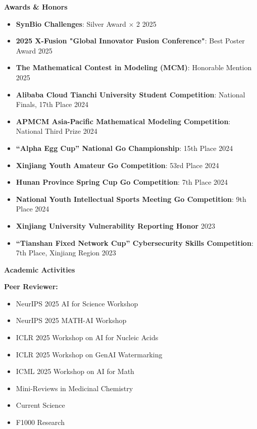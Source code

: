 \documentclass[11pt]{article}
\begin{document}
	\vspace{12pt}
	
	\begin{center}
		\textbf{\large Awards \& Honors}
	\end{center}
	\begin{itemize}[noitemsep, topsep=0pt, partopsep=0pt, parsep=0pt, leftmargin=*]
		\item \textbf{SynBio Challenges}: Silver Award $\times$ 2 \hfill 2025
		\item \textbf{2025 X-Fusion "Global Innovator Fusion Conference"}: Best Poster Award \hfill 2025
		\item \textbf{The Mathematical Contest in Modeling (MCM)}: Honorable Mention \hfill 2025
		\item \textbf{Alibaba Cloud Tianchi University Student Competition}: National Finals, 17th Place \hfill 2024
		\item \textbf{APMCM Asia-Pacific Mathematical Modeling Competition}: National Third Prize \hfill 2024
		\item \textbf{“Alpha Egg Cup” National Go Championship}: 15th Place \hfill 2024
		\item \textbf{Xinjiang Youth Amateur Go Competition}: 53rd Place \hfill 2024
		\item \textbf{Hunan Province Spring Cup Go Competition}: 7th Place \hfill 2024
		\item \textbf{National Youth Intellectual Sports Meeting Go Competition}: 9th Place \hfill 2024
		\item \textbf{Xinjiang University Vulnerability Reporting Honor} \hfill 2023
		\item \textbf{“Tianshan Fixed Network Cup” Cybersecurity Skills Competition}: 7th Place, Xinjiang Region \hfill 2023
	\end{itemize}

	\begin{center}
		\textbf{\large Academic Activities}
	\end{center}
	\textbf{Peer Reviewer:}
	\begin{multicols}{2}
		\begin{itemize}[noitemsep, topsep=0pt, partopsep=0pt, parsep=0pt, leftmargin=*]
			\item NeurIPS 2025 AI for Science Workshop
			\item NeurIPS 2025 MATH-AI Workshop
			\item ICLR 2025 Workshop on AI for Nucleic Acids
			\item ICLR 2025 Workshop on GenAI Watermarking
			\item ICML 2025 Workshop on AI for Math
			\item Mini-Reviews in Medicinal Chemistry
			\item Current Science
			\item F1000 Research
		\end{itemize}
	\end{multicols}
	
\end{document}

